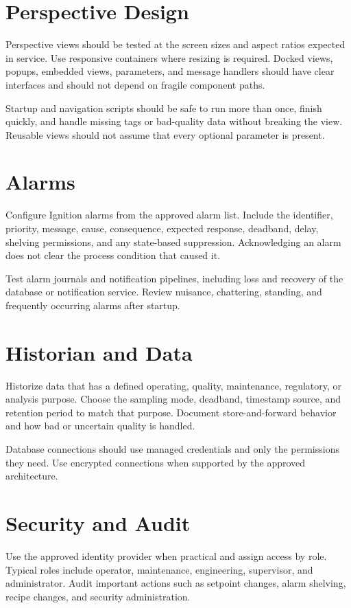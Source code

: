 \section{Perspective Design}
Perspective views should be tested at the screen sizes and aspect ratios expected in service. Use responsive containers where resizing is required. Docked views, popups, embedded views, parameters, and message handlers should have clear interfaces and should not depend on fragile component paths.

Startup and navigation scripts should be safe to run more than once, finish quickly, and handle missing tags or bad-quality data without breaking the view. Reusable views should not assume that every optional parameter is present.

\section{Alarms}
Configure Ignition alarms from the approved alarm list. Include the identifier, priority, message, cause, consequence, expected response, deadband, delay, shelving permissions, and any state-based suppression. Acknowledging an alarm does not clear the process condition that caused it.

Test alarm journals and notification pipelines, including loss and recovery of the database or notification service. Review nuisance, chattering, standing, and frequently occurring alarms after startup.

\section{Historian and Data}
Historize data that has a defined operating, quality, maintenance, regulatory, or analysis purpose. Choose the sampling mode, deadband, timestamp source, and retention period to match that purpose. Document store-and-forward behavior and how bad or uncertain quality is handled.

Database connections should use managed credentials and only the permissions they need. Use encrypted connections when supported by the approved architecture.

\section{Security and Audit}
Use the approved identity provider when practical and assign access by role. Typical roles include operator, maintenance, engineering, supervisor, and administrator. Audit important actions such as setpoint changes, alarm shelving, recipe changes, and security administration.

